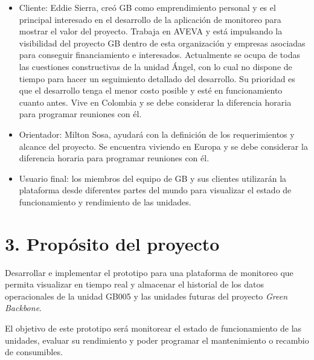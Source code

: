 \documentclass[
11pt, %
]{charter}
\begin{document}
\begin{itemize}
	\item Cliente: Eddie Sierra, creó GB como emprendimiento personal y es el principal interesado en el desarrollo de la aplicación de monitoreo para mostrar el valor del proyecto. Trabaja en AVEVA y está impulsando la visibilidad del proyecto GB dentro de esta organización y empresas asociadas para conseguir financiamiento e interesados. Actualmente se ocupa de todas las cuestiones constructivas de la unidad Ángel, con lo cual no dispone de tiempo para hacer un seguimiento detallado del desarrollo. Su prioridad es que el desarrollo tenga el menor costo posible y esté en funcionamiento cuanto antes. Vive en Colombia y se debe considerar la diferencia horaria para programar reuniones con él.
	\item Orientador: Milton Sosa, ayudará con la definición de los requerimientos y alcance del proyecto. Se encuentra viviendo en Europa y se debe considerar la diferencia horaria para programar reuniones con él.
	\item Usuario final: los miembros del equipo de GB y sus clientes utilizarán la plataforma desde diferentes partes del mundo para visualizar el estado de funcionamiento y rendimiento de las unidades.
\end{itemize}


\section{3. Propósito del proyecto}
\label{sec:proposito}

Desarrollar e implementar el prototipo para una plataforma de monitoreo que permita visualizar en tiempo real y almacenar el historial de los datos operacionales de la unidad GB005 y las unidades futuras del proyecto \textit{Green Backbone}. 

El objetivo de este prototipo será monitorear el estado de funcionamiento de las unidades, evaluar su rendimiento y poder programar el mantenimiento o recambio de consumibles.
\end{document}
